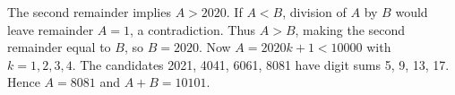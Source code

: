 The second remainder implies $A>2020$. If $A<B$, division of $A$ by $B$ would leave remainder $A=1$, a contradiction. Thus $A>B$, making the second remainder equal to $B$, so $B=2020$. Now $A=2020k+1<10000$ with $k=1,2,3,4$. The candidates 2021, 4041, 6061, 8081 have digit sums 5, 9, 13, 17. Hence $A=8081$ and $\boxed{A+B=10101}$.
